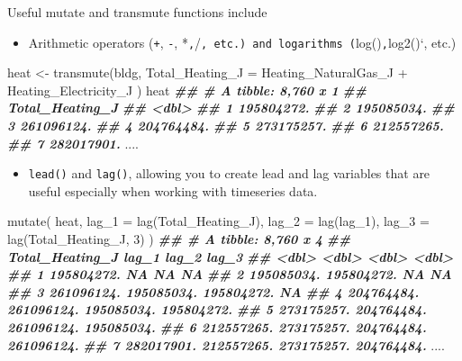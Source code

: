 \documentclass[
]{book}
\newenvironment{Shaded}{\begin{snugshade}}{\end{snugshade}}
\newcommand{\AttributeTok}[1]{\textcolor[rgb]{0.77,0.63,0.00}{#1}}
\newcommand{\DecValTok}[1]{\textcolor[rgb]{0.00,0.00,0.81}{#1}}
\newcommand{\DocumentationTok}[1]{\textcolor[rgb]{0.56,0.35,0.01}{\textbf{\textit{#1}}}}
\newcommand{\FunctionTok}[1]{\textcolor[rgb]{0.00,0.00,0.00}{#1}}
\newcommand{\NormalTok}[1]{#1}
\newcommand{\OtherTok}[1]{\textcolor[rgb]{0.56,0.35,0.01}{#1}}
\newcommand{\SpecialCharTok}[1]{\textcolor[rgb]{0.00,0.00,0.00}{#1}}
\providecommand{\tightlist}{%
  \setlength{\itemsep}{0pt}\setlength{\parskip}{0pt}}
\begin{document}
Useful mutate and transmute functions include

\begin{itemize}
\tightlist
\item
  Arithmetic operators (\texttt{+}, \texttt{-}, *\texttt{,}/\texttt{,\ etc.)\ and\ logarithms\ (}log()\texttt{,}log2()`, etc.)
\end{itemize}

\begin{Shaded}
\begin{Highlighting}[]
\NormalTok{heat }\OtherTok{\textless{}{-}} \FunctionTok{transmute}\NormalTok{(bldg,}
  \AttributeTok{Total\_Heating\_J =}\NormalTok{ Heating\_NaturalGas\_J }\SpecialCharTok{+}\NormalTok{ Heating\_Electricity\_J}
\NormalTok{  )}
\NormalTok{heat}
\DocumentationTok{\#\# \# A tibble: 8,760 x 1}
\DocumentationTok{\#\#    Total\_Heating\_J}
\DocumentationTok{\#\#              \textless{}dbl\textgreater{}}
\DocumentationTok{\#\#  1      195804272.}
\DocumentationTok{\#\#  2      195085034.}
\DocumentationTok{\#\#  3      261096124.}
\DocumentationTok{\#\#  4      204764484.}
\DocumentationTok{\#\#  5      273175257.}
\DocumentationTok{\#\#  6      212557265.}
\DocumentationTok{\#\#  7      282017901.}
\NormalTok{....}
\end{Highlighting}
\end{Shaded}

\begin{itemize}
\tightlist
\item
  \texttt{lead()} and \texttt{lag()}, allowing you to create lead and lag variables that are useful especially when working with timeseries data.
\end{itemize}

\begin{Shaded}
\begin{Highlighting}[]
\FunctionTok{mutate}\NormalTok{(}
\NormalTok{  heat,}
  \AttributeTok{lag\_1 =} \FunctionTok{lag}\NormalTok{(Total\_Heating\_J),}
  \AttributeTok{lag\_2 =} \FunctionTok{lag}\NormalTok{(lag\_1),}
  \AttributeTok{lag\_3 =} \FunctionTok{lag}\NormalTok{(Total\_Heating\_J, }\DecValTok{3}\NormalTok{)}
\NormalTok{)}
\DocumentationTok{\#\# \# A tibble: 8,760 x 4}
\DocumentationTok{\#\#    Total\_Heating\_J      lag\_1      lag\_2      lag\_3}
\DocumentationTok{\#\#              \textless{}dbl\textgreater{}      \textless{}dbl\textgreater{}      \textless{}dbl\textgreater{}      \textless{}dbl\textgreater{}}
\DocumentationTok{\#\#  1      195804272.        NA         NA         NA }
\DocumentationTok{\#\#  2      195085034. 195804272.        NA         NA }
\DocumentationTok{\#\#  3      261096124. 195085034. 195804272.        NA }
\DocumentationTok{\#\#  4      204764484. 261096124. 195085034. 195804272.}
\DocumentationTok{\#\#  5      273175257. 204764484. 261096124. 195085034.}
\DocumentationTok{\#\#  6      212557265. 273175257. 204764484. 261096124.}
\DocumentationTok{\#\#  7      282017901. 212557265. 273175257. 204764484.}
\NormalTok{....}
\end{Highlighting}
\end{Shaded}
\end{document}
